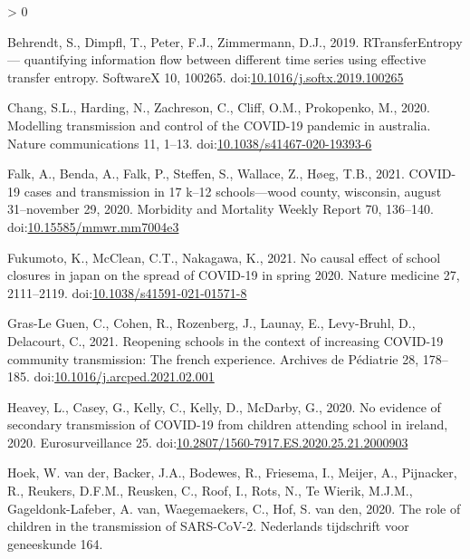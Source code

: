 \documentclass[]{elsarticle} %
\newlength{\cslhangindent}
\newenvironment{CSLReferences}[2] %
 {%
  \setlength{\parindent}{0pt}
  \ifodd #1 \everypar{\setlength{\hangindent}{\cslhangindent}}\ignorespaces\fi
  \ifnum #2 > 0
  \setlength{\parskip}{#2\baselineskip}
  \fi
 }%
 {}
\begin{document}
\hypertarget{refs}{}
\begin{CSLReferences}{1}{0}
\leavevmode\hypertarget{ref-behrendt2019rtransferentropy}{}%
Behrendt, S., Dimpfl, T., Peter, F.J., Zimmermann, D.J., 2019. RTransferEntropy --- quantifying information flow between different time series using effective transfer entropy. SoftwareX 10, 100265. doi:\href{https://doi.org/10.1016/j.softx.2019.100265}{10.1016/j.softx.2019.100265}

\leavevmode\hypertarget{ref-chang2020modelling}{}%
Chang, S.L., Harding, N., Zachreson, C., Cliff, O.M., Prokopenko, M., 2020. Modelling transmission and control of the COVID-19 pandemic in australia. Nature communications 11, 1--13. doi:\href{https://doi.org/10.1038/s41467-020-19393-6}{10.1038/s41467-020-19393-6}

\leavevmode\hypertarget{ref-falk2021covid}{}%
Falk, A., Benda, A., Falk, P., Steffen, S., Wallace, Z., Høeg, T.B., 2021. COVID-19 cases and transmission in 17 k--12 schools---wood county, wisconsin, august 31--november 29, 2020. Morbidity and Mortality Weekly Report 70, 136--140. doi:\href{https://doi.org/10.15585/mmwr.mm7004e3}{10.15585/mmwr.mm7004e3}

\leavevmode\hypertarget{ref-fukumoto2021no}{}%
Fukumoto, K., McClean, C.T., Nakagawa, K., 2021. No causal effect of school closures in japan on the spread of COVID-19 in spring 2020. Nature medicine 27, 2111--2119. doi:\href{https://doi.org/10.1038/s41591-021-01571-8}{10.1038/s41591-021-01571-8}

\leavevmode\hypertarget{ref-grasleguen2021reopening}{}%
Gras-Le Guen, C., Cohen, R., Rozenberg, J., Launay, E., Levy-Bruhl, D., Delacourt, C., 2021. Reopening schools in the context of increasing COVID-19 community transmission: The french experience. Archives de Pédiatrie 28, 178--185. doi:\href{https://doi.org/10.1016/j.arcped.2021.02.001}{10.1016/j.arcped.2021.02.001}

\leavevmode\hypertarget{ref-heavey2020evidence}{}%
Heavey, L., Casey, G., Kelly, C., Kelly, D., McDarby, G., 2020. No evidence of secondary transmission of COVID-19 from children attending school in ireland, 2020. Eurosurveillance 25. doi:\href{https://doi.org/10.2807/1560-7917.ES.2020.25.21.2000903}{10.2807/1560-7917.ES.2020.25.21.2000903}

\leavevmode\hypertarget{ref-vanderhoek2020role}{}%
Hoek, W. van der, Backer, J.A., Bodewes, R., Friesema, I., Meijer, A., Pijnacker, R., Reukers, D.F.M., Reusken, C., Roof, I., Rots, N., Te Wierik, M.J.M., Gageldonk-Lafeber, A. van, Waegemaekers, C., Hof, S. van den, 2020. The role of children in the transmission of SARS-CoV-2. Nederlands tijdschrift voor geneeskunde 164.


\end{CSLReferences}
\end{document}

